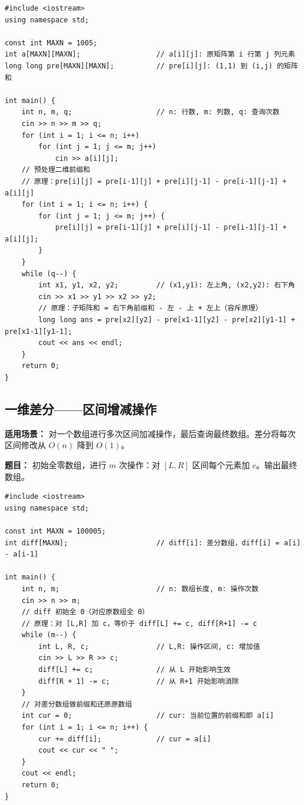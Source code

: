 \documentclass[12pt,a4paper]{ctexart}
\begin{document}
\begin{lstlisting}[caption={二维前缀和——O(1) 子矩阵和查询}]
#include <iostream>
using namespace std;

const int MAXN = 1005;
int a[MAXN][MAXN];                  // a[i][j]: 原矩阵第 i 行第 j 列元素
long long pre[MAXN][MAXN];          // pre[i][j]: (1,1) 到 (i,j) 的矩阵和

int main() {
    int n, m, q;                    // n: 行数, m: 列数, q: 查询次数
    cin >> n >> m >> q;
    for (int i = 1; i <= n; i++)
        for (int j = 1; j <= m; j++)
            cin >> a[i][j];
    // 预处理二维前缀和
    // 原理：pre[i][j] = pre[i-1][j] + pre[i][j-1] - pre[i-1][j-1] + a[i][j]
    for (int i = 1; i <= n; i++) {
        for (int j = 1; j <= m; j++) {
            pre[i][j] = pre[i-1][j] + pre[i][j-1] - pre[i-1][j-1] + a[i][j];
        }
    }
    while (q--) {
        int x1, y1, x2, y2;         // (x1,y1): 左上角, (x2,y2): 右下角
        cin >> x1 >> y1 >> x2 >> y2;
        // 原理：子矩阵和 = 右下角前缀和 - 左 - 上 + 左上（容斥原理）
        long long ans = pre[x2][y2] - pre[x1-1][y2] - pre[x2][y1-1] + pre[x1-1][y1-1];
        cout << ans << endl;
    }
    return 0;
}
\end{lstlisting}

\subsection{一维差分——区间增减操作}
\textbf{适用场景：} 对一个数组进行多次区间加减操作，最后查询最终数组。差分将每次区间修改从 $O(n)$ 降到 $O(1)$。

\textbf{题目：} 初始全零数组，进行 $m$ 次操作：对 $[L,R]$ 区间每个元素加 $c$。输出最终数组。

\begin{lstlisting}[caption={一维差分——O(1) 区间增减}]
#include <iostream>
using namespace std;

const int MAXN = 100005;
int diff[MAXN];                     // diff[i]: 差分数组，diff[i] = a[i] - a[i-1]

int main() {
    int n, m;                       // n: 数组长度, m: 操作次数
    cin >> n >> m;
    // diff 初始全 0（对应原数组全 0）
    // 原理：对 [L,R] 加 c，等价于 diff[L] += c, diff[R+1] -= c
    while (m--) {
        int L, R, c;                // L,R: 操作区间, c: 增加值
        cin >> L >> R >> c;
        diff[L] += c;               // 从 L 开始影响生效
        diff[R + 1] -= c;           // 从 R+1 开始影响消除
    }
    // 对差分数组做前缀和还原原数组
    int cur = 0;                    // cur: 当前位置的前缀和即 a[i]
    for (int i = 1; i <= n; i++) {
        cur += diff[i];             // cur = a[i]
        cout << cur << " ";
    }
    cout << endl;
    return 0;
}
\end{lstlisting}
\end{document}

